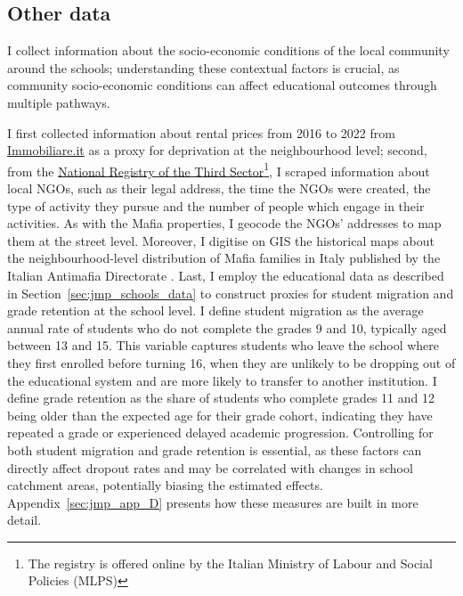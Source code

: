 \documentclass[12pt]{article}
\theoremstyle{plain}
\theoremstyle{plain}
\theoremstyle{plain}
\theoremstyle{definition}
\theoremstyle{plain}
\theoremstyle{definition}
\theoremstyle{plain}
\theoremstyle{remark}
\theoremstyle{definition}
\theoremstyle{definition}
\theoremstyle{plain}
\begin{document}
 
\FloatBarrier
\subsection{Other data}
\label{sec:jmp_other_data}
 I collect information about the socio-economic conditions of the local community around the schools; understanding these contextual factors is crucial, as community socio-economic conditions can affect educational outcomes through multiple pathways. \par
I first collected information about rental prices from 2016 to 2022 from \href{https://www.immobiliare.it/}{Immobiliare.it} as a proxy for deprivation at the neighbourhood level; second, from the \href{https://servizi.lavoro.gov.it/runts/it-it/}{National Registry of the Third Sector}\footnote{The registry is offered online by the Italian Ministry of Labour and Social Policies (MLPS)}, I scraped information about local NGOs, such as their legal address, the time the NGOs were created, the type of activity they pursue and the number of people which engage in their activities. As with the Mafia properties, I geocode the NGOs' addresses to map them at the street level. Moreover, I digitise on GIS the historical maps about the neighbourhood-level distribution of Mafia families in Italy published by the Italian Antimafia Directorate \citet{dia_relazione_2015-1, dia_relazione_2015}. Last, I employ the educational data as described in Section~\ref{sec:jmp_schools_data} to construct proxies for student migration and grade retention at the school level. I define student migration as the average annual rate of students who do not complete the grades 9 and 10, typically aged between 13 and 15. This variable captures students who leave the school where they first enrolled before turning 16, when they are unlikely to be dropping out of the educational system and are more likely to transfer to another institution. I define grade retention as the share of students who complete grades 11 and 12 being older than the expected age for their grade cohort, indicating they have repeated a grade or experienced delayed academic progression. Controlling for both student migration and grade retention is essential, as these factors can directly affect dropout rates and may be correlated with changes in school catchment areas, potentially biasing the estimated effects. Appendix~\ref{sec:jmp_app_D} presents how these measures are built in more detail. \par
\medskip
\end{document}
